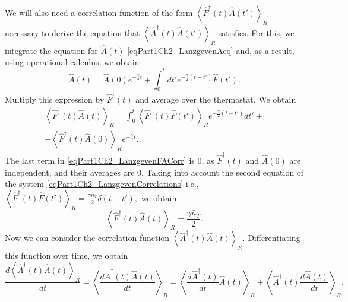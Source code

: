 We will also need a correlation function of the form
\(
\left<\hat{F}^{\dag}\left(t\right)\hat{A}\left(t'\right)\right>_R 
\) 
- necessary to derive the equation that 
\(
\left<\hat{A}^{\dag}\left(t\right)\hat{A}\left(t'\right)\right>_R 
\) satisfies. For this, we integrate the equation for $\hat{A}\left(t\right)$
\eqref{eqPart1Ch2_LanzgevenAeq} and, as a result, using
operational calculus, we obtain
\begin{equation} 
\hat{A}\left(t\right) = \hat{A}\left(0\right)e^{-\frac{\gamma}{2}t} +
\int_0^t d t' e^{-\frac{\gamma}{2}\left(t - t'\right)} \hat{F}\left(t'\right).
\nonumber
\end{equation} 
Multiply this expression by $\hat{F}^{\dag}\left(t\right)$ and average over
the thermostat. We obtain
\begin{eqnarray} 
\left<\hat{F}^{\dag}\left(t\right)\hat{A}\left(t\right)\right>_R = 
\int_0^t  
\left<\hat{F}^{\dag}\left(t\right)\hat{F}\left(t'\right)\right>_R 
e^{-\frac{\gamma}{2}\left(t - t'\right)}
d t' +
\nonumber \\
+ \left<\hat{F}^{\dag}\left(t\right)\hat{A}\left(0\right)\right>_R e^{-\frac{\gamma}{2}t}.
\label{eqPart1Ch2_LanzgevenFACorr}
\end{eqnarray} 
The last term in \eqref{eqPart1Ch2_LanzgevenFACorr} is $0$, as 
$\hat{F}^{\dag}\left(t\right)$ and $\hat{A}\left(0\right)$ are independent,
and their averages are $0$. Taking into account the second equation of the system 
\eqref{eqPart1Ch2_LanzgevenCorrelations} i.e.,
\(
\left<\hat{F}^{\dag}\left(t\right)\hat{F}\left(t'\right)\right>_R = 
\frac{\gamma \bar{n}_{T}}{2} \delta\left(t - t'\right),
\)
we obtain
\begin{equation}
\left<\hat{F}^{\dag}\left(t\right)\hat{A}\left(t\right)\right>_R = 
\frac{\gamma \bar{n}_{T}}{2}.
\nonumber
\end{equation}
Now we can consider the correlation function 
\(
\left<\hat{A}^{\dag}\left(t\right)\hat{A}\left(t\right)\right>_R
\). Differentiating this function over time, we obtain
\begin{equation}
\frac{d \left<\hat{A}^{\dag}\left(t\right)\hat{A}\left(t\right)\right>_R}{d
t}=
\left<\frac{d \hat{A}^{\dag}\left(t\right)\hat{A}\left(t\right)}{d
t}\right>_R =
\left<\frac{d \hat{A}^{\dag}\left(t\right)}{d
t} \hat{A}\left(t\right) \right>_R + 
\left<\hat{A}^{\dag}\left(t\right)\frac{d \hat{A}\left(t\right)}{d
t} \right>_R.
\label{eqPart1Ch2_Lanzgeven_dAA}
\end{equation}
